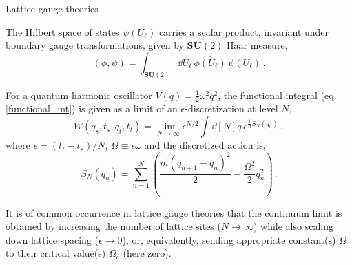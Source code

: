 \documentclass{beamer}
\begin{document}
\begin{frame}{Lattice gauge theories}
    \begin{list}{\maltese}{\leftmargin=1em \itemindent=0em}
        \item<1-> The Hilbert space of states $\psi(U_\ell)$ carries a scalar product, invariant under boundary gauge transformations, given by $\mathbf{SU}(2)$ Haar measure,
        \begin{equation}
            (\phi,\psi)=\int_{\mathbf{SU}(2)}\dd{U_\ell}\,\overline{\phi(U_\ell)}\,\psi(U_\ell)\,.
        \end{equation}
        \item<2-> For a quantum harmonic oscillator $V(q)=\frac{1}{2}\omega^2 q^2$, the functional integral (eq. \ref{functional_int}) is given as a limit of an $\epsilon$-discretization at level $N$,
        \begin{equation}
            W(q_s,t_s,q_t,t_t)=\lim_{N\to\infty}\epsilon^{N/2}\int\dd[N]{q}\,e^{\frac{i}{\hbar}S_N(q_n)}\,,
        \end{equation}
        where $\epsilon=(t_t-t_s)/N$, $\Omega\equiv\epsilon\omega$ and the discretized action is, 
        \begin{equation}
            S_N(q_n)=\sum_{n=1}^N\left(\frac{m(q_{n+1}-q_n)^2}{2}-\frac{\Omega^2}{2}q_n^2\right)\,.
        \end{equation}
        \item<3-> It is of common occurrence in lattice gauge theories that the continuum limit is obtained by increasing the number of lattice sites ($N\to\infty$) while also scaling down lattice spacing ($\epsilon\to 0$), or, equivalently, sending appropriate constant(s) $\Omega$ to their critical value(s) $\Omega_\text{c}$ (here zero).
    \end{list}
\end{frame}
\end{document}
